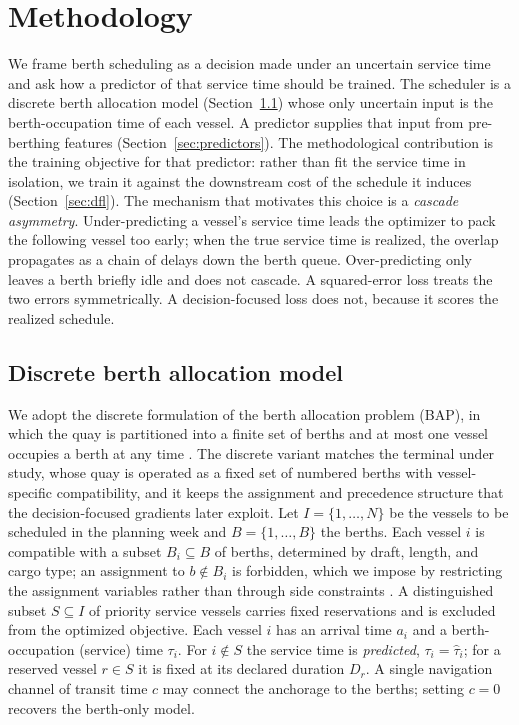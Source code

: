\section{Methodology}\label{sec:method}

We frame berth scheduling as a decision made under an uncertain service time and
ask how a predictor of that service time should be trained. The scheduler is a
discrete berth allocation model (Section~\ref{sec:milp}) whose only uncertain
input is the berth-occupation time of each vessel. A predictor supplies that
input from pre-berthing features (Section~\ref{sec:predictors}). The
methodological contribution is the training objective for that predictor: rather
than fit the service time in isolation, we train it against the downstream cost
of the schedule it induces (Section~\ref{sec:dfl}). The mechanism that motivates
this choice is a \emph{cascade asymmetry}. Under-predicting a vessel's service
time leads the optimizer to pack the following vessel too early; when the true
service time is realized, the overlap propagates as a chain of delays down the
berth queue. Over-predicting only leaves a berth briefly idle and does not
cascade. A squared-error loss treats the two errors symmetrically. A
decision-focused loss does not, because it scores the realized schedule.

\subsection{Discrete berth allocation model}\label{sec:milp}

We adopt the discrete formulation of the berth allocation problem (BAP), in which
the quay is partitioned into a finite set of berths and at most one vessel
occupies a berth at any time \citep{imai2001dynamic, buhrkal2011models}. The
discrete variant matches the terminal under study, whose quay is operated as a
fixed set of numbered berths with vessel-specific compatibility, and it keeps the
assignment and precedence structure that the decision-focused gradients later
exploit. Let
$I=\{1,\dots,N\}$ be the vessels to be scheduled in the planning week and
$B=\{1,\dots,B\}$ the berths. Each vessel $i$ is compatible with a subset
$B_i\subseteq B$ of berths, determined by draft, length, and cargo type; an
assignment to $b\notin B_i$ is forbidden, which we impose by restricting the
assignment variables rather than through side constraints
\citep{alzaabi2016berth}. A distinguished subset $S\subseteq I$ of priority
service vessels carries fixed reservations and is excluded from the optimized
objective. Each vessel $i$ has an arrival time $a_i$ and a berth-occupation
(service) time $\tau_i$. For $i\notin S$ the service time is \emph{predicted},
$\tau_i=\hat\tau_i$; for a reserved vessel $r\in S$ it is fixed at its declared
duration $D_r$. A single navigation channel of transit time $c$ may connect the
anchorage to the berths; setting $c=0$ recovers the berth-only model.

